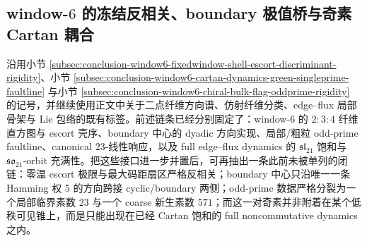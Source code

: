 \subsection{window-\texorpdfstring{$6$}{6} 的冻结反相关、boundary 极值桥与奇素 Cartan 耦合}\label{subsec:conclusion-window6-freezing-bridge-primefault-cartan-coupling}

沿用小节 \ref{subsec:conclusion-window6-fixedwindow-shell-escort-discriminant-rigidity}、小节 \ref{subsec:conclusion-window6-cartan-dynamics-green-singleprime-faultline} 与小节 \ref{subsec:conclusion-window6-chiral-bulk-flag-oddprime-rigidity} 的记号，并继续使用正文中关于二点纤维方向谱、仿射纤维分类、edge--flux 局部骨架与 Lie 包络的既有标签。前述链条已经分别固定了：window-\(6\) 的 \(2{:}3{:}4\) 纤维直方图与 escort 壳序、boundary 中心的 dyadic 方向实现、局部/粗粒 odd-prime faultline、canonical \(23\)-线性响应，以及 full edge--flux dynamics 的 \(\mathfrak{sl}_{21}\) 饱和与 \(\mathfrak{so}_{21}\)-orbit 充满性。把这些接口进一步并置后，可再抽出一条此前未被单列的闭链：零温 escort 极限与最大码距扇区严格反相关；boundary 中心只沿唯一一条 Hamming 权 \(5\) 的方向跨接 cyclic/boundary 两侧；odd-prime 数据严格分裂为一个局部临界素数 \(23\) 与一个 coarse 新生素数 \(571\)；而这一对奇素并非附着在某个低秩可见锥上，而是只能出现在已经 Cartan 饱和的 full noncommutative dynamics 之内。

